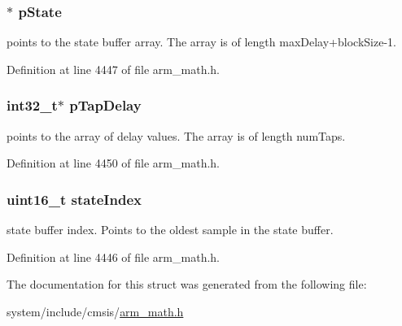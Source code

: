 \subsubsection[{\texorpdfstring{p\+State}{pState}}]{$\ast$ p\+State}\hypertarget{structarm__fir__sparse__instance__q31_adee4ba3ee8869865af7d8fa08ca913d6}{}\label{structarm__fir__sparse__instance__q31_adee4ba3ee8869865af7d8fa08ca913d6}
points to the state buffer array. The array is of length max\+Delay+block\+Size-\/1. 

Definition at line 4447 of file arm\+\_\+math.\+h.

\subsubsection[{\texorpdfstring{p\+Tap\+Delay}{pTapDelay}}]{\setlength{\rightskip}{0pt plus 5cm}int32\+\_\+t$\ast$ p\+Tap\+Delay}\hypertarget{structarm__fir__sparse__instance__q31_adec00b3793ab4f08edfeb4ea6a9eb6e6}{}\label{structarm__fir__sparse__instance__q31_adec00b3793ab4f08edfeb4ea6a9eb6e6}
points to the array of delay values. The array is of length num\+Taps. 

Definition at line 4450 of file arm\+\_\+math.\+h.

\subsubsection[{\texorpdfstring{state\+Index}{stateIndex}}]{\setlength{\rightskip}{0pt plus 5cm}uint16\+\_\+t state\+Index}\hypertarget{structarm__fir__sparse__instance__q31_a566a0cb53437e48b9a3bf18e5b03d8aa}{}\label{structarm__fir__sparse__instance__q31_a566a0cb53437e48b9a3bf18e5b03d8aa}
state buffer index. Points to the oldest sample in the state buffer. 

Definition at line 4446 of file arm\+\_\+math.\+h.



The documentation for this struct was generated from the following file\+:\begin{DoxyCompactItemize}
\item 
system/include/cmsis/\hyperlink{arm__math_8h}{arm\+\_\+math.\+h}\end{DoxyCompactItemize}
